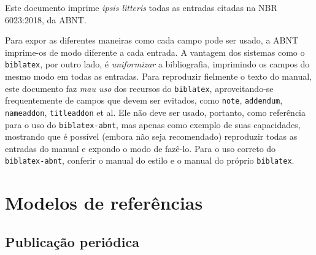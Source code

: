 \documentclass[a4paper]{article}
\title{NBR 6023:2018 - \iftoggle{reference}{Referência}{Teste}}
\author{Daniel Ballester Marques}
\let\origsection\section
\renewcommand\section{\clearpage\origsection}
\begin{document}
\maketitle

Este documento imprime \textit{ipsis litteris} todas as entradas citadas na
NBR 6023:2018, da ABNT.

Para expor as diferentes maneiras como cada campo pode ser usado, a ABNT
imprime-os de modo diferente a cada entrada. A vantagem dos sistemas como
o \texttt{biblatex}, por outro lado, é \emph{uniformizar} a bibliografia,
imprimindo os campos do mesmo modo em todas as entradas. Para reproduzir
fielmente o texto do manual, este documento faz \emph{mau uso} dos recursos do
\texttt{biblatex}, aproveitando-se frequentemente de campos que devem ser
evitados, como \texttt{note}, \texttt{addendum}, \texttt{nameaddon},
\texttt{titleaddon} et al. Ele não deve ser usado, portanto, como referência
para o uso do \texttt{biblatex-abnt}, mas apenas como exemplo de suas
capacidades, mostrando que é possível (embora não seja recomendado) reproduzir
todas as entradas do manual e expondo o modo de fazê-lo. Para o uso correto do
\texttt{biblatex-abnt}, conferir o manual do estilo e o manual do próprio
\texttt{biblatex}.

\tableofcontents

\nocite{*}


\setcounter{section}{6}

\section{Modelos de referências}


	\printbibliography[keyword=7.1, title={Monografia no todo}]

	\printbibliography[keyword=7.2,
    title={Monografia no todo em meio eletrônico}]

	\printbibliography[keyword=7.3, title={Parte de monografia}]

	\printbibliography[keyword=7.4,
    title={Parte de monografia em meio eletrônico}]

   \printbibliography[keyword=7.5, title={Correspondência}]

   \printbibliography[keyword=7.6,
   title={Correspondência disponível em meio eletrônico}]

   \subsection{Publicação periódica}
\end{document}
